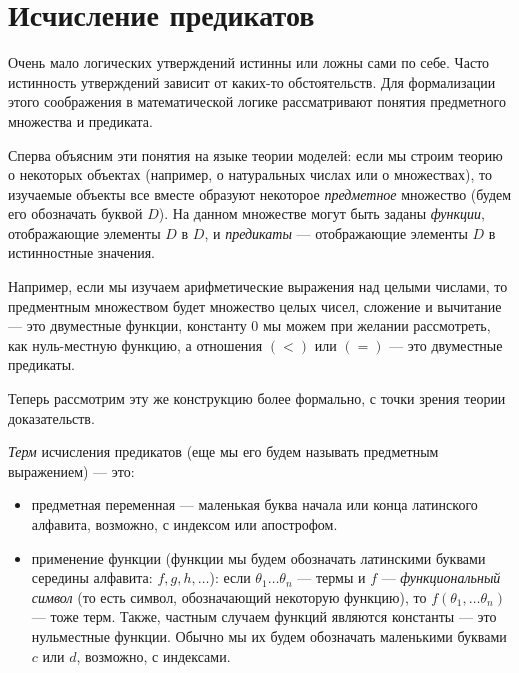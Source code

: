 \section{Исчисление предикатов}

Очень мало логических утверждений истинны или ложны сами по себе.
Часто истинность утверждений зависит от каких-то обстоятельств.
Для формализации этого соображения в математической логике рассматривают
понятия предметного множества и предиката.

Сперва объясним эти понятия на языке теории моделей:
если мы строим теорию о некоторых объектах (например, о натуральных 
числах или о множествах), то изучаемые объекты все вместе образуют 
некоторое \emph{предметное} множество (будем его обозначать буквой $D$). 
На данном множестве могут быть заданы \emph{функции}, отображающие элементы
$D$ в $D$, и \emph{предикаты} --- отображающие элементы $D$ в 
истинностные значения.

Например, если мы изучаем арифметические выражения над целыми числами, 
то предментным множеством будет множество целых чисел, сложение и 
вычитание --- это двуместные функции, константу $0$ мы можем при желании
рассмотреть, как нуль-местную функцию, а отношения $(<)$ или $(=)$ ---
это двуместные предикаты.

Теперь рассмотрим эту же конструкцию более формально, с точки зрения теории 
доказательств.

\begin{definition}\emph{Терм} исчисления предикатов (еще мы его будем
называть предметным выражением) --- это:
\begin{itemize}
\item предметная переменная --- маленькая буква начала или конца латинского 
алфавита, возможно, с индексом или апострофом.
\item применение функции (функции мы будем обозначать латинскими 
буквами середины алфавита: $f, g, h, \dots$):
если $\theta_1 \dots \theta_n$ --- термы и $f$ --- 
\emph{функциональный символ} (то есть символ, обозначающий некоторую
функцию), то $f (\theta_1, \dots \theta_n)$ 
--- тоже терм. Также, частным случаем функций являются константы ---
это нульместные функции. Обычно мы их будем обозначать маленькими 
буквами $c$ или $d$, возможно, с индексами.
\end{itemize}
\end{definition}

